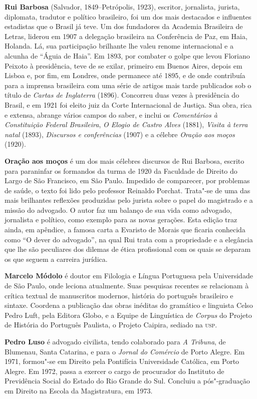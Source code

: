 \textbf{Rui Barbosa} (Salvador, 1849--Petrópolis, 1923), escritor, jornalista, 
jurista, diplomata, tradutor e político brasileiro, foi um dos mais destacados 
e influentes estadistas que o Brasil já teve. Um dos fundadores da Academia 
Brasileira de Letras, liderou em 1907 a delegação brasileira na Conferência 
de Paz, em Haia, Holanda. Lá, sua participação brilhante lhe valeu renome 
internacional e a alcunha de “Águia de Haia”. Em 1893, por combater o golpe 
que levou Floriano Peixoto à presidência, teve de se exilar, primeiro em  
Buenos Aires, depois em Lisboa e, por fim, em Londres, onde permanece até 
1895, e de onde contribuía para a imprensa brasileira com uma série de 
artigos mais tarde publicados sob o título de \textit{Cartas de Inglaterra} 
(1896). Concorreu duas vezes à presidência do Brasil, e em 1921 foi eleito 
juiz da Corte Internacional de Justiça. Sua obra, rica e extensa, abrange 
vários campos do saber, e inclui os \textit{Comentários à Constituição 
Federal Brasileira}, \textit{O Elogio de Castro Alves} (1881), 
\textit{Visita à terra natal} (1893), \textit{Discursos e conferências} 
(1907) e a célebre \textit{Oração aos moços} (1920).

\textbf{Oração aos moços} é um dos mais célebres discursos de Rui
Barbosa, escrito para paraninfar os formandos da
turma de 1920 da Faculdade de Direito do Largo de São Francisco, em São
Paulo. Impedido de comparecer,  por problemas de saúde, o texto foi
lido pelo professor Reinaldo Porchat. Trata"-se de uma das mais
brilhantes reflexões produzidas pelo jurista sobre o papel do
magistrado e a missão do advogado. O autor faz um balanço de sua vida
como advogado, jornalista e político, como exemplo para as novas
gerações. Esta edição traz ainda, em apêndice, a famosa carta
a Evaristo de Morais que ficaria conhecida como ``O dever do advogado'',
na qual Rui trata com a propriedade e a elegância que lhe são peculiares
dos dilemas de ética profissional com os quais se deparam os que 
seguem a carreira jurídica. 


\textbf{Marcelo Módolo} é doutor em Filologia e Língua Portuguesa pela
Universidade de São Paulo, onde leciona atualmente. Suas pesquisas
recentes se relacionam à crítica textual de manuscritos modernos,
história do português brasileiro e sintaxe. Coordena a publicação 
das obras inéditas do gramático e linguista Celso Pedro Luft, 
pela Editora Globo, e a Equipe de Linguística de \textit{Corpus} 
do Projeto de História do Português Paulista, o
Projeto Caipira, sediado na \textsc{usp}.

\textbf{Pedro Luso} é advogado civilista, tendo colaborado para \textit{A Tribuna}, 
de  Blumenau, Santa Catarina, e para o \textit{Jornal do Comércio} de Porto Alegre.  
Em 1971, formou"-se em  Direito pela Pontifícia Universidade Católica, 
em Porto Alegre.  Em 1972,  passa a exercer o cargo de procurador do 
Instituto de Previdência  Social do Estado do Rio Grande do Sul.  
Concluiu a pós"-graduação em Direito na Escola da Magistratura, em 1973. 


